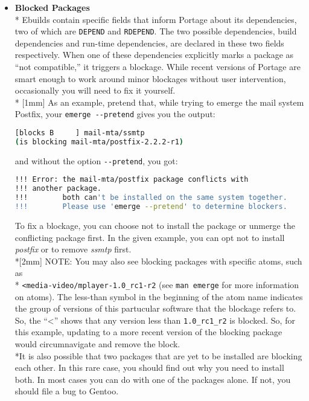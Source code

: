 \documentclass[11pt]{article}
\begin{document}
\begin{itemize}
      \item \textbf{Blocked Packages}
       \\* Ebuilds contain specific fields that inform Portage about its dependencies, two of which are \verb|DEPEND| and \verb|RDEPEND|. The two possible dependencies, build dependencies and run-time dependencies, are declared in these two fields respectively. When one of these dependencies explicitly marks a package as ``not compatible,'' it triggers a blockage. While recent versions of Portage are smart enough to work around minor blockages without user intervention, occasionally you will need to fix it yourself. 
       \\* [1mm] As an example, pretend that, while trying to emerge the mail system Postfix, your \verb|emerge --pretend| gives you the output:
       \begin{lstlisting}[basicstyle=\ttfamily, backgroundcolor = \color{lightgray}, language = bash, xleftmargin = 0cm, framexleftmargin = 1em, framexrightmargin = 1em, showstringspaces=false]
[blocks B     ] mail-mta/ssmtp 
(is blocking mail-mta/postfix-2.2.2-r1)
\end{lstlisting}
        and without the option \verb|--pretend|, you got:
        \begin{lstlisting}[basicstyle=\ttfamily, backgroundcolor = \color{lightgray}, language = bash, xleftmargin = 0cm, framexleftmargin = 1em, framexrightmargin = 4em, showstringspaces=false]
!!! Error: the mail-mta/postfix package conflicts with 
!!! another package.
!!!        both can't be installed on the same system together.
!!!        Please use 'emerge --pretend' to determine blockers. 
\end{lstlisting}
        To fix a blockage, you can choose not to install the package or unmerge the conflicting package first. In the given example, you can opt not to install \textit{postfix} or to remove \textit{ssmtp} first.
        \\*[2mm] NOTE: You may also see blocking packages with specific atoms, such as 
        \\* \verb|<media-video/mplayer-1.0_rc1-r2| (see \verb|man emerge| for more information on atoms). The less-than symbol in the beginning of the atom name indicates the group of versions of this partucular software that the blockage refers to. So, the ``\textless'' shows that any version less than \verb|1.0_rc1_r2| is blocked. So, for this example, updating to a more recent version of the blocking package would circumnavigate and remove the block. 
        \\*It is also possible that two packages that are yet to be installed are blocking each other. In this rare case, you should find out why you need to install both. In most cases you can do with one of the packages alone. If not, you should file a bug to Gentoo.
    

\end{itemize}
\end{document}

